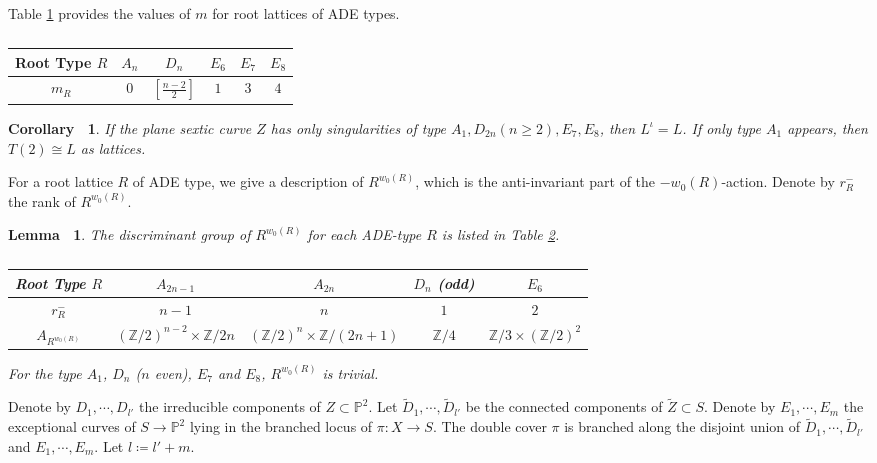 \documentclass[12pt,reqno,a4paper]{amsart}
\newtheorem{lem}[thm]{Lemma~}
\newtheorem{cor}[thm]{Corollary~}
\theoremstyle{remark}
\theoremstyle{definition}
\begin{document}
Table \ref{table: m_R} provides the values of $m$ for root lattices of ADE types.

\begin{table}[htbp]    \centering    \caption{}    \begin{tabular}{cccccc}
  \toprule
  Root Type $R$ & $A_n$ & $D_n$ & $E_6$ & $E_7$ & $E_8$ \\    \midrule
  $m_R$ & $0$ & $[\frac{n-2}{2}]$ & $1$ & $3$ & $4$ \\    \bottomrule
  \end{tabular}
  \label{table: m_R}  \end{table}

\begin{cor}
\label{cor: if only A_1,D_2n,E_7,E_8}
    If the plane sextic curve $Z$ has only singularities of type $A_1,D_{2n}(n\ge 2),E_7,E_8$, then $L^\iota=L$. If only type $A_1$ appears, then $T(2)\cong L$ as lattices.
\end{cor}


For a root lattice $R$ of ADE type, we give a description of $R^{w_0(R)}$, which is the anti-invariant part of the $-w_0(R)$-action.
Denote by $r_R^-$ the rank of $R^{w_0(R)}$.
\begin{lem}
\label{lem: anti-inv}
    The discriminant group of $R^{w_0(R)}$ for each ADE-type $R$ is listed in Table \ref{tab: r_R^-}.
\begin{table}[htbp]    \centering    \caption{}    \begin{tabular}{ccccc}
  \toprule
  Root Type $R$ & $A_{2n-1}$ & $A_{2n}$ & $D_{n}$ (odd) & $E_6$  \\    \midrule
  $r_R^-$ & $n-1$ & $n$ & $1$ & $2$ \\   $A_{R^{w_0(R)}}$ & $(\mathbb{Z}/2)^{n-2}\times \mathbb{Z}/2n$ & $(\mathbb{Z}/2)^n\times \mathbb{Z}/(2n+1)$ & $\mathbb{Z}/4$ & $\mathbb{Z}/3\times(\mathbb{Z}/2)^2$ \\    \bottomrule
  \end{tabular}
  \label{tab: r_R^-}  \end{table}
For the type $A_1$, $D_n$ ($n$ even), $E_7$ and $E_8$, $R^{w_0(R)}$ is trivial.
\end{lem}

Denote by $D_1,\cdots,D_{l'}$ the irreducible components of $Z\subset \mathbb{P}^2$.
Let $\widetilde{D}_1,\cdots,\widetilde{D}_{l'}$ be the connected components of $\widetilde{Z}\subset S$.
Denote by $E_1,\cdots,E_{m}$ the exceptional curves of $S\to \mathbb{P}^2$ lying in the branched locus of $\pi\colon X\to S$.
The double cover $\pi$ is branched along the disjoint union of $\widetilde{D}_1,\cdots,\widetilde{D}_{l'}$ and $E_1,\cdots,E_{m}$.
Let $l\coloneqq l'+m$.
\end{document}
